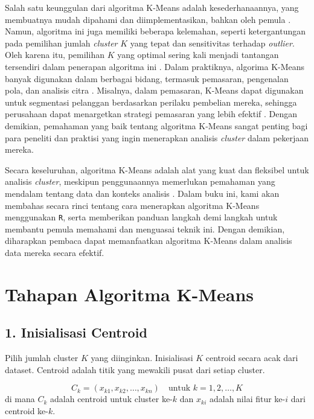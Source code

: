 \documentclass[
  oneside]{book}
\begin{document}
Salah satu keunggulan dari algoritma K-Means adalah kesederhanaannya, yang membuatnya mudah dipahami dan diimplementasikan, bahkan oleh pemula \citep{han2011data}. Namun, algoritma ini juga memiliki beberapa kelemahan, seperti ketergantungan pada pemilihan jumlah \emph{cluster} \(K\) yang tepat dan sensitivitas terhadap \emph{outlier}. Oleh karena itu, pemilihan \(K\) yang optimal sering kali menjadi tantangan tersendiri dalam penerapan algoritma ini \citep{elbow1975outline}. Dalam praktiknya, algorima K-Means banyak digunakan dalam berbagai bidang, termasuk pemasaran, pengenalan pola, dan analisis citra \citep{xu2005survey}. Misalnya, dalam pemasaran, K-Means dapat digunakan untuk segmentasi pelanggan berdasarkan perilaku pembelian mereka, sehingga perusahaan dapat menargetkan strategi pemasaran yang lebih efektif \citep{kumar2016creating}. Dengan demikian, pemahaman yang baik tentang algoritma K-Means sangat penting bagi para peneliti dan praktisi yang ingin menerapkan analisis \emph{cluster} dalam pekerjaan mereka.

Secara keseluruhan, algoritma K-Means adalah alat yang kuat dan fleksibel untuk analisis \emph{cluster}, meskipun penggunaannya memerlukan pemahaman yang mendalam tentang data dan konteks analisis \citep{bishop2006pattern}. Dalam buku ini, kami akan membahas secara rinci tentang cara menerapkan algoritma K-Means menggunakan \texttt{R}, serta memberikan panduan langkah demi langkah untuk membantu pemula memahami dan menguasai teknik ini. Dengan demikian, diharapkan pembaca dapat memanfaatkan algoritma K-Means dalam analisis data mereka secara efektif.

\section{Tahapan Algoritma K-Means}\label{tahapan-algoritma-k-means}

\subsection*{1. Inisialisasi Centroid}\label{inisialisasi-centroid}

Pilih jumlah cluster \(K\) yang diinginkan. Inisialisasi \(K\) centroid secara acak dari dataset. Centroid adalah titik yang mewakili pusat dari setiap cluster.

\[
C_k = (x_{k1}, x_{k2}, \ldots, x_{kn}) \quad \text{untuk } k = 1, 2, \ldots, K
\]
di mana \(C_k\) adalah centroid untuk cluster ke-\(k\) dan \(x_{ki}\) adalah nilai fitur ke-\(i\) dari centroid ke-\(k\).
\end{document}
